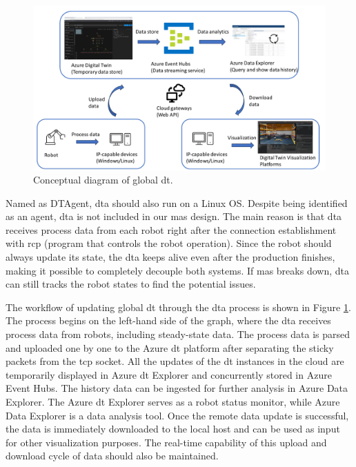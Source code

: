 \begin{figure}[htb]
    \centering
\includegraphics[width=\textwidth]{figures/DT_Conceptual_Diagram.pdf}
\caption{Conceptual diagram of global \gls{dt}. \label{fig: DTConceptual}}
\end{figure}

Named as DTAgent, \gls{dta} 
should also run on a Linux OS.
Despite being identified as an agent, \gls{dta} is not included in our 
\gls{mas} design. The main reason is that \gls{dta} receives process data from 
each robot right after the connection establishment with \gls{rcp} 
(program that controls the robot operation). Since the robot 
should always update its state, the \gls{dta} keeps alive even 
after the production finishes, making it possible to completely decouple 
both systems. If \gls{mas} breaks down, \gls{dta} can still tracks the robot 
states to find the potential issues. 


The workflow of updating global \gls{dt} through the \gls{dta} process is shown 
in Figure \ref{fig: DTConceptual}. The process begins on the left-hand side of the 
graph, where the \gls{dta} receives process data from robots, including steady-state 
data. The process data is parsed and uploaded one by one to the Azure \gls{dt} 
platform after separating the sticky packets from the \gls{tcp} socket.
All the updates of the \gls{dt} instances in the cloud are temporarily displayed 
in Azure \gls{dt} Explorer and concurrently stored in Azure Event Hubs. The history 
data can be ingested for further analysis in Azure Data Explorer. The Azure \gls{dt} 
Explorer serves as a robot status monitor, while Azure Data Explorer is a data analysis tool.
Once the remote data update is successful, the data is immediately downloaded to the local 
host and can be used as input for other visualization purposes. The real-time capability 
of this upload and download cycle of data should also be maintained.

